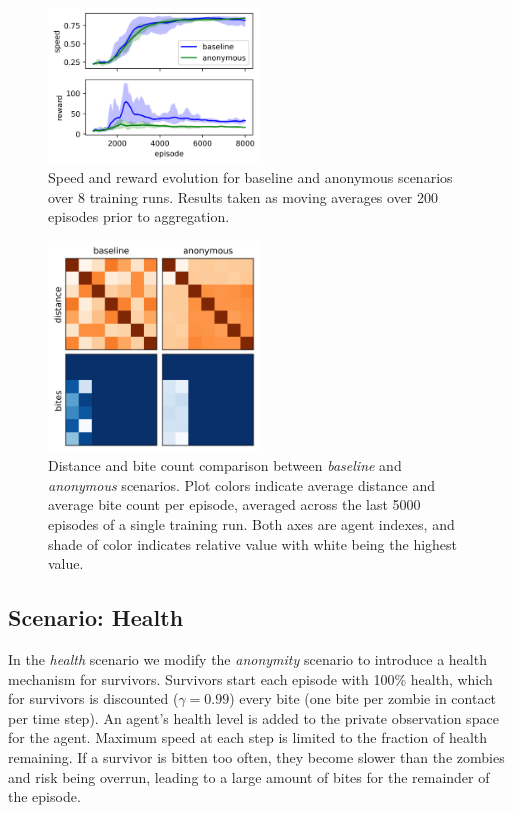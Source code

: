 \documentclass[11pt,a4paper]{article}
\begin{document}
\begin{figure}
  \centering
  \includegraphics[width=0.5\textwidth]{figures/anon_base_compare.png}
  \caption{
    Speed and reward evolution for baseline and anonymous scenarios over 8 training runs.
    Results taken as moving averages over 200 episodes prior to aggregation.
  }
  \label{fig:anon_base_compare}
\end{figure}

\begin{figure}
  \centering
  \includegraphics[width=0.5\textwidth]{figures/anon_base_dist_bite.png}
  \caption{
    Distance and bite count comparison between \emph{baseline} and \emph{anonymous} scenarios.
    Plot colors indicate average distance and average bite count per episode, averaged across the last 5000 episodes of a single training run.
    Both axes are agent indexes, and shade of color indicates relative value with white being the highest value.
  }
  \label{fig:anon_base_dist_bite}
\end{figure}

\subsection{Scenario: Health}
\label{sec:health}

In the \emph{health} scenario we modify the \emph{anonymity} scenario to introduce a health mechanism for survivors.
Survivors start each episode with 100\% health, which for survivors is discounted ($\gamma=0.99$) every bite (one bite per zombie in contact per time step).
An agent's health level is added to the private observation space for the agent.
Maximum speed at each step is limited to the fraction of health remaining.
If a survivor is bitten too often, they become slower than the zombies and risk being overrun, leading to a large amount of bites for the remainder of the episode.
\end{document}

